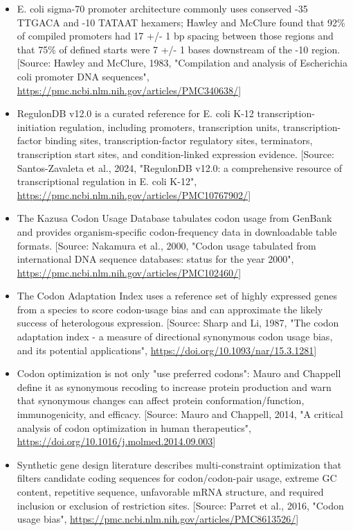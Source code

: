 \documentclass[11pt]{report}
\begin{document}
\begin{itemize}
\item E. coli sigma-70 promoter architecture commonly uses conserved -35 TTGACA and -10 TATAAT hexamers; Hawley and McClure found that 92\% of compiled promoters had 17 +/- 1 bp spacing between those regions and that 75\% of defined starts were 7 +/- 1 bases downstream of the -10 region. [Source: Hawley and McClure, 1983, "Compilation and analysis of Escherichia coli promoter DNA sequences", \url{https://pmc.ncbi.nlm.nih.gov/articles/PMC340638/}]
\item RegulonDB v12.0 is a curated reference for E. coli K-12 transcription-initiation regulation, including promoters, transcription units, transcription-factor binding sites, transcription-factor regulatory sites, terminators, transcription start sites, and condition-linked expression evidence. [Source: Santos-Zavaleta et al., 2024, "RegulonDB v12.0: a comprehensive resource of transcriptional regulation in E. coli K-12", \url{https://pmc.ncbi.nlm.nih.gov/articles/PMC10767902/}]
\item The Kazusa Codon Usage Database tabulates codon usage from GenBank and provides organism-specific codon-frequency data in downloadable table formats. [Source: Nakamura et al., 2000, "Codon usage tabulated from international DNA sequence databases: status for the year 2000", \url{https://pmc.ncbi.nlm.nih.gov/articles/PMC102460/}]
\item The Codon Adaptation Index uses a reference set of highly expressed genes from a species to score codon-usage bias and can approximate the likely success of heterologous expression. [Source: Sharp and Li, 1987, "The codon adaptation index - a measure of directional synonymous codon usage bias, and its potential applications", \url{https://doi.org/10.1093/nar/15.3.1281}]
\item Codon optimization is not only "use preferred codons": Mauro and Chappell define it as synonymous recoding to increase protein production and warn that synonymous changes can affect protein conformation/function, immunogenicity, and efficacy. [Source: Mauro and Chappell, 2014, "A critical analysis of codon optimization in human therapeutics", \url{https://doi.org/10.1016/j.molmed.2014.09.003}]
\item Synthetic gene design literature describes multi-constraint optimization that filters candidate coding sequences for codon/codon-pair usage, extreme GC content, repetitive sequence, unfavorable mRNA structure, and required inclusion or exclusion of restriction sites. [Source: Parret et al., 2016, "Codon usage bias", \url{https://pmc.ncbi.nlm.nih.gov/articles/PMC8613526/}]

\end{itemize}
\end{document}
